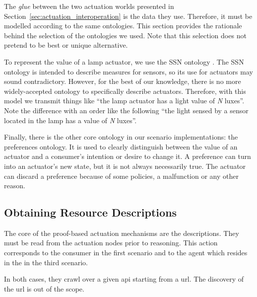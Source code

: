 The \emph{glue} between the two actuation worlds presented in Section~\ref{sec:actuation_interoperation} is the data they use. %
Therefore, it must be modelled according to the same ontologies.
This section provides the rationale behind the selection of the ontologies we used.
Note that this selection does not pretend to be best or unique alternative.

To represent the value of a lamp actuator, we use the SSN ontology .
The SSN ontology is intended to describe measures for sensors, so its use for actuators may sound contradictory.
However, for the best of our knowledge, there is no more widely-accepted ontology to specifically describe actuators.
Therefore, with this model we transmit things like ``the lamp actuator has a light value of \emph{N} luxes''.
Note the difference with an order like the following ``the light sensed by a sensor located in the lamp has a value of \emph{N} luxes''.


Finally, there is the other core ontology in our scenario implementations: the preferences ontology.
It is used to clearly distinguish between the value of an actuator and a consumer's intention or desire to change it.
A preference can turn into an actuator's new state, but it is not always necessarily true.
The actuator can discard a preference because of some policies, a malfunction or any other reason.



\subsection{Obtaining Resource Descriptions}

The core of the proof-based actuation mechanisms are the descriptions.
They must be read from the actuation nodes prior to reasoning. %
This action corresponds to the consumer in the first scenario and to the agent which resides in the \Space{} in the third scenario.

In both cases, they crawl over a given \ac{api} starting from a \ac{url}.
The discovery of the \ac{url} is out of the scope.


